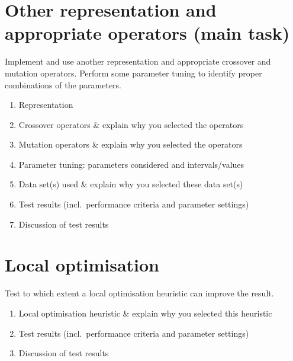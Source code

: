 \documentclass[a4paper,11pt]{article}
\begin{document}
\section{Other representation and appropriate operators  (main task)}
Implement and use another representation and appropriate crossover and mutation operators. Perform some parameter tuning to identify proper combinations of the parameters. 
\begin{enumerate}
\item	 Representation
\item Crossover operators \& explain why you selected the operators
\item Mutation operators \& explain why you selected the operators
\item Parameter tuning: parameters considered and intervals/values
\item Data set(s) used  \& explain why you selected these data set(s)
\item Test results (incl.\ performance criteria and parameter settings)
\item Discussion of test results

\end{enumerate}

\section{Local optimisation}
Test to which extent a local optimisation heuristic can improve the result.
\begin{enumerate}
\item	Local optimisation heuristic \& explain why you selected this heuristic
\item Test results (incl.\ performance criteria and parameter settings)
\item Discussion of test results

\end{enumerate}
\end{document}
